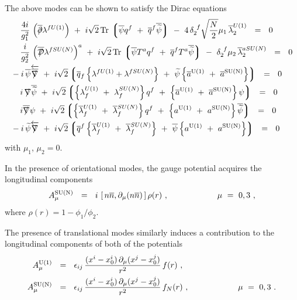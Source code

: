 \documentclass{article}
\newcommand{\p}{\partial}
\newcommand{\wt}{\widetilde}
\newcommand{\ov}{\overline}
\newcommand{\md}{\mathcal{D}}
\newcommand{\lgr}{\left\lgroup}
\newcommand{\rgr}{\right\rgroup}
\def\slashed#1{\setbox0=\hbox{$#1$}             %
   \dimen0=\wd0                                 %
   \setbox1=\hbox{/} \dimen1=\wd1               %
   \ifdim\dimen0>\dimen1                        %
      \rlap{\hbox to \dimen0{\hfil/\hfil}}      %
      #1                                        %
   \else                                        %
      \rlap{\hbox to \dimen1{\hfil$#1$\hfil}}   %
      /                                         %
   \fi}                                        %
\newcommand{\aU}{a^{\rm U(1)}}
\newcommand{\aN}{a^{\rm SU(N)}}
\newcommand{\baU}{\ov{a}{}^{\rm U(1)}}
\newcommand{\baN}{\ov{a}{}^{\rm SU(N)}}
\newcommand{\Tr}{{\rm Tr\,}}
\newcommand{\nbar}{\ov{n}}
\begin{document}
	The above modes can be shown to satisfy the Dirac equations
\begin{align*}
%
	&\phantom{-i}
	\frac{4i}{g_1^2}\, \left( \ov{\slashed{\p}}\lambda^{f U(1)} \right) 
		~+~  i \sqrt{2}\, \Tr\lgr \ov{\psi} q^f  ~+~ \ov{q}{}^f \ov{\wt{\psi}} \rgr
		~-~ 4\, \delta_2^{\ f}\sqrt{\frac{N}{2}} \mu_1\, \ov{\lambda}^{U(1)}_2  ~~=~~ 0 \\
%
	&\phantom{-i}
	\frac{i}{g_2^2}\, \left( \ov{\slashed{\md}}\lambda^{f SU(N)}\right)^a 
		~+~ i \sqrt{2}\, \Tr\lgr \ov{\psi}T^a q^f  ~+~  \ov{q}{}^f T^a \ov{\wt{\psi}} \rgr
		~-~ \delta_2^{\ f} \mu_2\, \ov{\lambda}{}_2^{a SU(N)}  ~~=~~ 0 \\
%
	&
	-i\, \ov{\psi} \overleftarrow{\ov{\slashed{\nabla}}}
		~+~ i \sqrt{2} \lgr \ov{q}{}_f \left\{ \lambda^{f U(1)} + \lambda^{f SU(N)} \right\}
					~+~ \wt{\psi} \left\{ \baU  ~+~ \baN \right\} \rgr    ~~=~~ 0 \\
%
	&\phantom{-i}
	i\, \slashed{\nabla} \ov{\wt{\psi}} 
		~+~ i \sqrt{2} \lgr \left\{ \lambda_f^{U(1)} ~+~ \lambda_f^{SU(N)} \right\} q^f
					~+~ \left\{ \baU ~+~ \baN \right\}\psi \rgr  ~~=~~ 0 \\
%
	&\phantom{-i}
	i \ov{\slashed{\nabla}}\psi 
		~+~ i \sqrt{2} \lgr \left\{ \ov{\lambda}{}^{U(1)}_f ~+~ \ov{\lambda}{}^{SU(N)}_f \right\} q^f
					~+~ \left\{ \aU ~+~ \aN \right\} \ov{\wt{\psi}} \rgr   ~~=~~ 0 \\
%
	&
	-i\, \wt{\psi} \overleftarrow{\slashed{\nabla}}
		~+~ i \sqrt{2} \lgr \ov{q}{}^f \left\{ \ov{\lambda}{}_f^{U(1)} ~+~ \ov{\lambda}{}_f^{SU(N)} \right\}
					~+~ \ov{\psi} \left\{ \aU ~+~ \aN \right\} \rgr  ~~=~~ 0
\end{align*}
	with $ \mu_1 $, $ \mu_2 = 0 $.

	In the presence of orientational modes, the gauge potential acquires the longitudinal components
\[
	A_\mu^{\rm SU(N)} ~~=~~ i\, \left[\, n\nbar, \p_\mu(n\nbar)\, \right] \rho(r)~,   \qquad\qquad\qquad \mu~=~0, 3~,
\]
	where $ \rho(r) = 1 - \phi_1/\phi_2 $.

	The presence of translational modes similarly induces a contribution to the longitudinal components of both
	of the potentials
\begin{align*}
%
	A_\mu^{\rm U(1)}	& ~~=~~ \epsilon_{ij}\,\frac{ (x^i - x_0^i)\,\p_\mu(x^j - x_0^j)} {r^2}\, f(r)~, \\
%
	A_\mu^{\rm SU(N)}	& ~~=~~ \epsilon_{ij}\,\frac{ (x^i - x_0^i)\,\p_\mu(x^j - x_0^j)} {r^2}\, f_N(r)~,
				\qquad\qquad\qquad \mu~=~0, 3~.
\end{align*}
\end{document}
